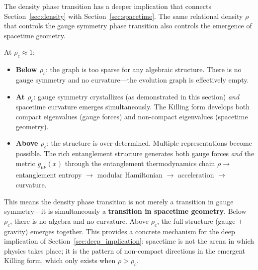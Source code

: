 The density phase transition has a deeper implication that connects Section~\ref{sec:density} with Section~\ref{sec:spacetime}. The same relational density $\rho$ that controls the gauge symmetry phase transition also controls the emergence of spacetime geometry.

At $\rho_c \approx 1$:
\begin{itemize}
\item \textbf{Below $\rho_c$}: the graph is too sparse for any algebraic structure. There is no gauge symmetry and no curvature---the evolution graph is effectively empty.

\item \textbf{At $\rho_c$}: gauge symmetry crystallizes (as demonstrated in this section) \textit{and} spacetime curvature emerges simultaneously. The Killing form develops both compact eigenvalues (gauge forces) and non-compact eigenvalues (spacetime geometry).

\item \textbf{Above $\rho_c$}: the structure is over-determined. Multiple representations become possible. The rich entanglement structure generates both gauge forces \textit{and} the metric $g_{\mu\nu}(x)$ through the entanglement thermodynamics chain $\rho \to$ entanglement entropy $\to$ modular Hamiltonian $\to$ acceleration $\to$ curvature.
\end{itemize}

This means the density phase transition is not merely a transition in gauge symmetry---it is simultaneously a \textbf{transition in spacetime geometry}. Below $\rho_c$, there is no algebra and no curvature. Above $\rho_c$, the full structure (gauge $+$ gravity) emerges together. This provides a concrete mechanism for the deep implication of Section~\ref{sec:deep_implication}: spacetime is not the arena in which physics takes place; it is the pattern of non-compact directions in the emergent Killing form, which only exists when $\rho > \rho_c$.
